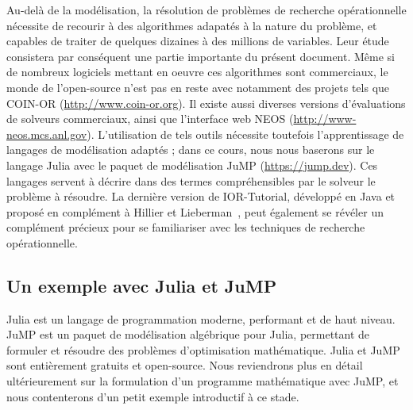 Au-delà de la modélisation, la résolution de problèmes de recherche opérationnelle nécessite de recourir à des algorithmes adapatés à la nature du problème, et capables de traiter de quelques dizaines à des millions de variables.
Leur étude consistera par conséquent une partie importante du présent document.
Même si de nombreux logiciels mettant en oeuvre ces algorithmes sont commerciaux, le monde de l'open-source n'est pas en reste avec notamment des projets tels que COIN-OR (\url{http://www.coin-or.org}). Il existe aussi diverses versions d'évaluations de solveurs commerciaux, ainsi que l'interface web NEOS (\url{http://www-neos.mcs.anl.gov}).
L'utilisation de tels outils nécessite toutefois l'apprentissage de langages de modélisation adaptés ; dans ce cours, nous nous baserons sur le langage Julia avec le paquet de modélisation JuMP (\url{https://jump.dev}).
Ces langages servent à décrire dans des termes compréhensibles par le solveur le problème à résoudre.
La dernière version de IOR-Tutorial, développé en Java et proposé en complément à Hillier et Lieberman~\cite{HillLieb01}, peut également se révéler un complément précieux pour se familiariser avec les techniques de recherche opérationnelle.

\subsection{Un exemple avec Julia et JuMP}

Julia est un langage de programmation moderne, performant et de haut niveau. JuMP est un paquet de modélisation algébrique pour Julia, permettant de formuler et résoudre des problèmes d'optimisation mathématique.
Julia et JuMP sont entièrement gratuits et open-source.
Nous reviendrons plus en détail ultérieurement sur la formulation d'un programme mathématique avec JuMP, et nous contenterons d'un petit exemple introductif à ce stade.

